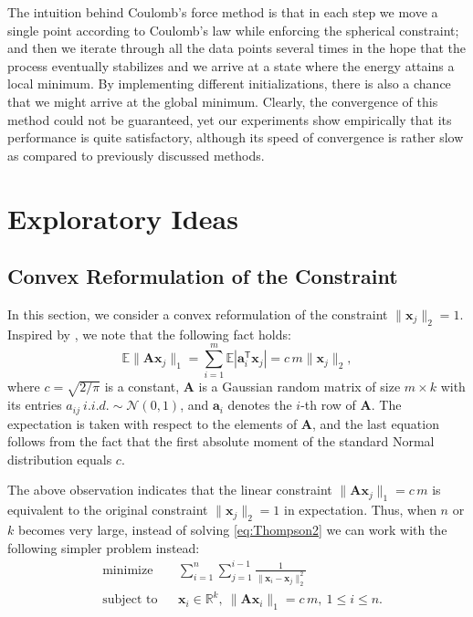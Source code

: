 \documentclass[11pt]{article}
\begin{document}
The intuition behind Coulomb's force method is that in each step we move a single point according to Coulomb's law while enforcing the spherical constraint; and then we iterate through all the data points several times in the hope that the process eventually stabilizes and we arrive at a state where the energy attains a local minimum. By implementing different initializations, there is also a chance that we might arrive at the global minimum. Clearly, the convergence of this method could not be guaranteed, yet our experiments show empirically that its performance is quite satisfactory, although its speed of convergence is rather slow as compared to previously discussed methods.

\section{Exploratory Ideas}\label{sec:Explore}

\subsection{Convex Reformulation of the Constraint}

In this section, we consider a convex reformulation of the constraint $\|\bm{x}_j\|_2=1$. Inspired by \cite{PV2013}, we note that the following fact holds:
$$ \mathbb{E}\|\bm{A}\bm{x}_j\|_1 = \sum_{i=1}^m \mathbb{E}|\bm{a}_i^\mathsf{T}\bm{x}_j| = c\,m\|\bm{x}_j\|_2, $$
where $c = \sqrt{2/\pi}$ is a constant, $\bm{A}$ is a Gaussian random matrix of size $m\times k$ with its entries $a_{ij}\ i.i.d. \sim\mathcal{N}(0,1)$, and $\bm{a}_i$ denotes the $i$-th row of $\bm{A}$. The expectation is taken with respect to the elements of $\bm{A}$, and the last equation follows from the fact that the first absolute moment of the standard Normal distribution equals $c$.

The above observation indicates that the linear constraint $\|\bm{A}\bm{x}_j\|_1 = c\,m$ is equivalent to the original constraint $\|\bm{x}_j\|_2=1$  in expectation. Thus, when $n$ or $k$ becomes very large, instead of solving \eqref{eq:Thompson2} we can work with the following simpler problem instead:
\begin{equation}\label{eq:Thompson1}
\begin{aligned}
& \text{minimize}
& & \sum_{i=1}^n\sum_{j=1}^{i-1}\frac{1}{\|\bm{x}_i-\bm{x}_j\|_2^2} \\
& \text{subject to}
& & \bm{x}_i\in\mathbb{R}^k,\ \|\bm{A}\bm{x}_i\|_1 = c\,m,\ 1 \le i \le n.
\end{aligned}
\end{equation}
\end{document}
